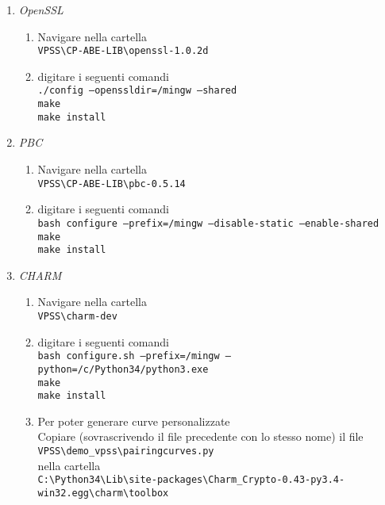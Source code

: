 \documentclass[a4paper,twoside,10pt,openany]{scrbook}
\begin{document}
\begin{enumerate}
\begin{enumerate}
\begin{enumerate}
{		    make\\
		    make install}
    \end{enumerate}
    \item \emph{OpenSSL}
    \begin{enumerate}
      \item Navigare nella cartella \\
	    \texttt{VPSS\textbackslash CP-ABE-LIB\textbackslash openssl-1.0.2d}
      \item  digitare i seguenti comandi\\
	    \texttt{./config --openssldir=/mingw --shared\\
		    make\\
		    make install}
    \end{enumerate}
    \item \emph{PBC}
    \begin{enumerate}
      \item Navigare nella cartella \\
	    \texttt{VPSS\textbackslash CP-ABE-LIB\textbackslash pbc-0.5.14}
      \item  digitare i seguenti comandi\\
	    \texttt{bash configure --prefix=/mingw --disable-static --enable-shared\\
		    make\\
		    make install}
    \end{enumerate}
    \item \emph{CHARM}
    \begin{enumerate}
      \item Navigare nella cartella \\
	    \texttt{VPSS\textbackslash charm-dev}
      \item  digitare i seguenti comandi\\
	    \texttt{bash configure.sh --prefix=/mingw --python=/c/Python34/python3.exe\\
		    make\\
		    make install}
      \item Per poter generare curve personalizzate\\
	    Copiare (sovrascrivendo il file precedente con lo stesso nome) il file\\
	    \texttt{VPSS\textbackslash demo\_vpss\textbackslash pairingcurves.py}\\
	    nella cartella\\
	    \texttt{C:\textbackslash Python34\textbackslash Lib\textbackslash site-packages\textbackslash Charm\_Crypto-0.43-py3.4-win32.egg\textbackslash charm\textbackslash toolbox}
    \end{enumerate}
  \end{enumerate}
\end{enumerate}
%
\end{document}
